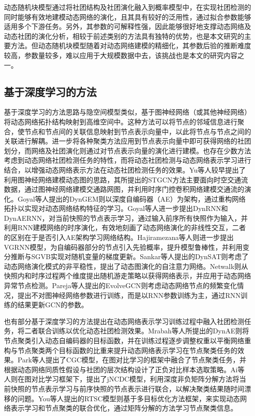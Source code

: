 动态随机块模型通过将社团结构及社团演化融入到概率模型中，在实现社团检测的同时能够有效地建模动态网络的演化，且其具有较好的泛用性，通过拟合参数能够适用多个下游任务。另外，其参数的可解释性强，因此能够很好地支撑动态网络及动态社团的演化分析，相较于前述类别的方法具有独特的优势，也是本文研究的主要方法。但动态随机块模型随着对动态网络建模的精细化，其参数后验的推断难度较高，参数量较多，难以应用于大规模数据中去，该挑战也是本文的研究内容之一。



\subsection{基于深度学习的方法}

基于深度学习的方法思路与隐空间模型类似，基于图神经网络（或其他神经网络）将动态网络拓扑结构映射到高维空间中。这种方法可以将节点的邻域信息进行聚合，使节点和节点间的关联信息映射到节点表示向量中，以此将节点与节点之间的关联进行解耦。进一步将各种聚类方法应用到节点表示向量中即可获得网络的社团划分，而网络及社团演化则通过对节点表示向量的演化进行建模。也存在少数方法考虑到动态网络社团检测任务的特性，而将动态社团检测与动态网络表示学习进行结合，以增强动态网络表示方法在动态社团检测任务的效果。Yu等人较早提出了利用图神经网络建模动态图的思路，其所提出的STGCN\cite{yu2017spatio}方法主要面向时空交通流数据，通过图神经网络建模交通路网图，并利用时序门控卷积网络建模交通流的演化。Goyal等人提出的DynGEM\cite{goyal2018dyngem}则以深度自编码器（AE）为架构，通过重构网络拓扑以实现对动态网络结构特征的学习。Goyal等人进一步提出DynRNN和DynAERNN\cite{goyal2020dyngraph2vec}，对当前快照的节点表示学习，通过输入前序所有快照作为输入，并利用RNN建模网络的时序演化，有效地刻画了动态网络演化的非线性交互，二者的区别在于是否引入AE架构学习网络结构。Hajiramezana等人\cite{hajiramezanali2019variational}则进一步提出VGRNN模型，为自编码器部分的节点引入先验概率，提升模型鲁棒性，并利用变分推断与SGVB实现对随机变量的梯度更新。Sankar等人提出的DynSAT\cite{sankar2018dynamic}则考虑了动态网络演化模式的非平稳性，提出了动态图演化的自注意力网络。Netwalk\cite{yu2018netwalk}则从快照内和时序过程两个维度提出随机游走策略以获得网络表示，并应用于动态网络异常节点检测。Pareja等人提出的EvolveGCN\cite{pareja2020evolvegcn}则考虑动态网络节点的频繁变化情况，提出不对图神经网络参数进行训练，而是以RNN参数训练为主，通过RNN训练的结果更新GCN的参数。

也有部分基于深度学习的方法提出在动态网络表示学习训练过程中融入社团检测任务，将二者联合训练以优化动态社团检测效果。Mrabah等人所提出的DynAE\cite{mrabah2019deep}则将节点聚类引入动态自编码器的目标函数，并在训练过程逐步调整权重以平衡网络重构与节点聚类两个目标函数的比重来提升动态网络表示学习在节点聚类任务的效果。Park等人\cite{park2022cgc}提出了CGC模型，在图对比学习的框架中融合了节点聚类任务，并根据动态网络同质性假设与社团的层次结构设计了正负对比样本选取策略。Ai等人\cite{10502242}则在图对比学习框架下，提出了jNCDC模型，利用深度非负矩阵分解方法将当前快照的节点表示学习与前序快照的节点表示进行联合，以解决聚类结果随时间漂移的问题。You等人\cite{you2021robust}提出的RTSC模型则基于多目标优化方法框架，来实现动态网络表示学习和节点聚类的联合优化，通过矩阵分解的方法学习节点聚类信息。


